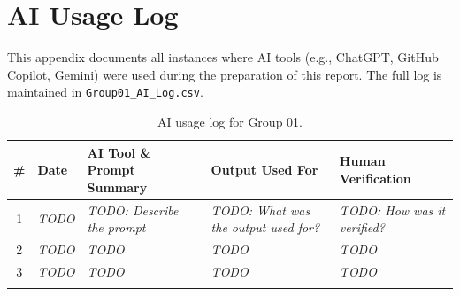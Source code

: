 \section{AI Usage Log}
\label{sec:ai-log}

This appendix documents all instances where AI tools (e.g., ChatGPT, GitHub
Copilot, Gemini) were used during the preparation of this report.  The full
log is maintained in \texttt{Group01\_AI\_Log.csv}.


\begin{longtable}{c l p{3.5cm} p{3.5cm} p{3cm}}
\toprule
\textbf{\#} &
\textbf{Date} &
\textbf{AI Tool \& Prompt Summary} &
\textbf{Output Used For} &
\textbf{Human Verification} \\
\midrule
\endhead
1 &
\textit{TODO} &
\textit{TODO: Describe the prompt} &
\textit{TODO: What was the output used for?} &
\textit{TODO: How was it verified?} \\[4pt]
2 &
\textit{TODO} &
\textit{TODO} &
\textit{TODO} &
\textit{TODO} \\[4pt]
3 &
\textit{TODO} &
\textit{TODO} &
\textit{TODO} &
\textit{TODO} \\
\bottomrule
\caption{AI usage log for Group 01.}
\label{tab:ai-log}
\end{longtable}

% 
